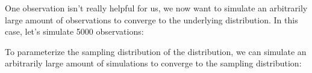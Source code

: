 \documentclass[letterpaper,10pt,english]{sphinxmanual}
\begin{document}
\sphinxAtStartPar
One observation isn’t really helpful for us, we now want to simulate an
arbitrarily large amount of observations to converge to the underlying
distribution. In this case, let’s simulate 5000 observations:

\begin{sphinxVerbatim}[commandchars=\\\{\}]
   
  
\end{sphinxVerbatim}

\sphinxAtStartPar
To parameterize the sampling distribution of the distribution, we can
simulate an arbitrarily large amount of simulations to converge to the
sampling distribution:
\end{document}
